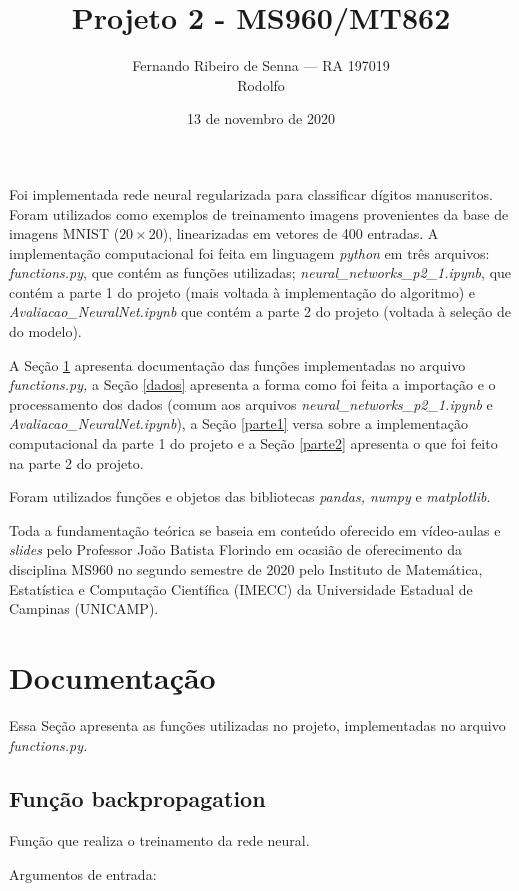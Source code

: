 \documentclass[12pt]{article}
\title{Projeto 2 - MS960/MT862}
\author{Fernando Ribeiro de Senna --- RA 197019\\
Rodolfo}
\date{13 de novembro de 2020}
\begin{document}
\maketitle

Foi implementada rede neural regularizada para classificar dígitos manuscritos. Foram utilizados como exemplos de treinamento imagens provenientes da base de imagens MNIST ($20 \times 20$), linearizadas em vetores de 400 entradas. A implementação computacional foi feita em linguagem \textit{python} em três arquivos: \textit{functions.py}, que contém as funções utilizadas; \textit{neural\_networks\_p2\_1.ipynb}, que contém a parte 1 do projeto (mais voltada à implementação do algoritmo) e \textit{Avaliacao\_NeuralNet.ipynb} que contém a parte 2 do projeto (voltada à seleção de do modelo).

A Seção \ref{doc} apresenta documentação das funções implementadas no arquivo \textit{functions.py,} a Seção \ref{dados} apresenta a forma como foi feita a importação e o processamento dos dados (comum aos arquivos \textit{neural\_networks\_p2\_1.ipynb} e \textit{Avaliacao\_NeuralNet.ipynb}), a Seção \ref{parte1} versa sobre a implementação computacional da parte 1 do projeto e a Seção \ref{parte2} apresenta o que foi feito na parte 2 do projeto.

Foram utilizados funções e objetos das bibliotecas \textit{pandas, numpy} e \textit{matplotlib}. 

Toda a fundamentação teórica se baseia em conteúdo oferecido em vídeo-aulas e \textit{slides} pelo Professor João Batista Florindo em ocasião de oferecimento da disciplina MS960 no segundo semestre de 2020 pelo Instituto de Matemática, Estatística e Computação Científica (IMECC) da Universidade Estadual de Campinas (UNICAMP).


\section{Documentação} \label{doc}
Essa Seção apresenta as funções utilizadas no projeto, implementadas no arquivo \textit{functions.py.}

\subsection{Função backpropagation}
Função que realiza o treinamento da rede neural.

Argumentos de entrada:
\end{document}
